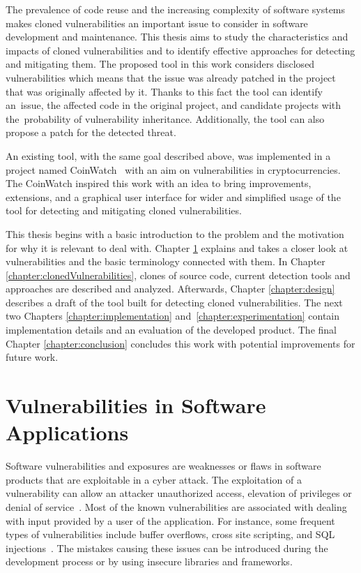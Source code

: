   The prevalence of code reuse and the increasing complexity of software systems makes cloned vulnerabilities
  an important issue to consider in software development and maintenance. This thesis aims to study the
  characteristics and impacts of cloned vulnerabilities and to identify effective approaches for detecting
  and mitigating them. The proposed tool in this work considers disclosed vulnerabilities which means
  that the issue was already patched in the project that was originally affected by it. Thanks to this fact
  the tool can identify an~issue, the affected code in the original project, and candidate projects with
  the~probability of vulnerability inheritance. Additionally, the tool can also propose a patch for
  the detected threat.

  An existing tool, with the same goal described above, was implemented in a project named CoinWatch~\cite{CoinWatch}
  with an aim on vulnerabilities in cryptocurrencies. The CoinWatch inspired this work
  with an idea to bring improvements, extensions, and a graphical user interface for wider and simplified
  usage of the tool for detecting and mitigating cloned vulnerabilities.

  This thesis begins with a basic introduction to the problem and the motivation for why it is relevant
  to deal with. Chapter \ref{chapter:vulnerabilities} explains and takes a closer look at vulnerabilities
  and the basic terminology connected with them. In Chapter \ref{chapter:clonedVulnerabilities}, clones of source
  code, current detection tools and approaches are described and analyzed. Afterwards, Chapter \ref{chapter:design}
  describes a draft of the tool built for detecting cloned vulnerabilities. The next two Chapters
  \ref{chapter:implementation} and~\ref{chapter:experimentation} contain implementation details
  and an evaluation of the developed product. The final Chapter \ref{chapter:conclusion} concludes this work
  with potential improvements for future work.


\chapter{Vulnerabilities in Software Applications}
\label{chapter:vulnerabilities}
  Software vulnerabilities and exposures are weaknesses or flaws in software products that are
  exploitable in a cyber attack. The exploitation of a vulnerability can allow an attacker unauthorized
  access, elevation of privileges or denial of service~\cite{SoftwareVulnerabilities}.
  Most of the known vulnerabilities are associated with dealing with input provided by a user
  of the application. For instance, some frequent types of vulnerabilities include buffer overflows,
  cross site scripting, and SQL injections~\cite{vulnerabilities}. The mistakes causing these issues
  can be introduced during the development process or by using insecure libraries and frameworks.

